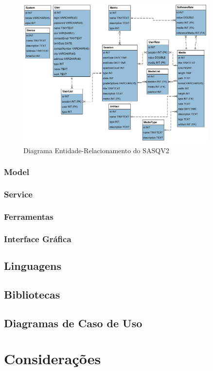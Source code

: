 \begin{figure}[!htb]
	\centering
	\includegraphics[width=0.9\textwidth]{./imgs/diagramaER.png}
	\caption{Diagrama Entidade-Relacionamento do SASQV2}
	\label{fig:diagramaER}
\end{figure}

\subsubsection{Model}
\subsubsection{Service}
\subsubsection{Ferramentas}
\subsubsection{Interface Gráfica}
\subsection{Linguagens}
\subsection{Bibliotecas}
\subsection{Diagramas de Caso de Uso}
\section{Considerações}
